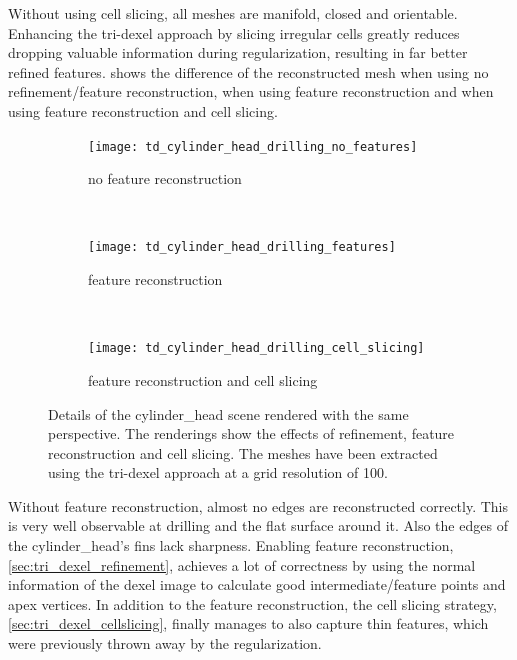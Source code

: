 Without using cell slicing, all meshes are manifold, closed and orientable.
Enhancing the tri-dexel approach by slicing irregular cells greatly reduces dropping valuable information during regularization, resulting in far better refined features.
 shows the difference of the reconstructed mesh when using no refinement/feature reconstruction, when using feature reconstruction and when using feature reconstruction and cell slicing.
%
\begin{figure}
	\centering
	\begin{subfigure}[b]{0.67\textwidth}
		\centering
		\texttt{[image: td\_cylinder\_head\_drilling\_no\_features]}
		\caption{no feature reconstruction}
		\label{fig:td_cylinder_head_drilling_no_features}
	\end{subfigure}
	\bigskip\\
	\begin{subfigure}[b]{0.67\textwidth}
		\centering
		\texttt{[image: td\_cylinder\_head\_drilling\_features]}
		\caption{feature reconstruction}
		\label{fig:td_cylinder_head_drilling_features}
	\end{subfigure}
	\bigskip\\
	\begin{subfigure}[b]{0.67\textwidth}
		\centering
		\texttt{[image: td\_cylinder\_head\_drilling\_cell\_slicing]}
		\caption{feature reconstruction and cell slicing}
		\label{fig:td_cylinder_head_drilling_cell_slicing}
	\end{subfigure}
	\caption{
		Details of the cylinder\_head scene rendered with the same perspective.
		The renderings show the effects of refinement, feature reconstruction and cell slicing.
		The meshes have been extracted using the tri-dexel approach at a grid resolution of 100.
	}
	\label{fig:td_features_and_cell_slicing}
\end{figure}
%
Without feature reconstruction, almost no edges are reconstructed correctly.
This is very well observable at drilling and the flat surface around it.
Also the edges of the cylinder\_head's fins lack sharpness.
Enabling feature reconstruction, \cf \cref{sec:tri_dexel_refinement}, achieves a lot of correctness by using the normal information of the dexel image to calculate good intermediate/feature points and apex vertices.
In addition to the feature reconstruction, the cell slicing strategy, \cf \cref{sec:tri_dexel_cellslicing}, finally manages to also capture thin features, which were previously thrown away by the regularization.

